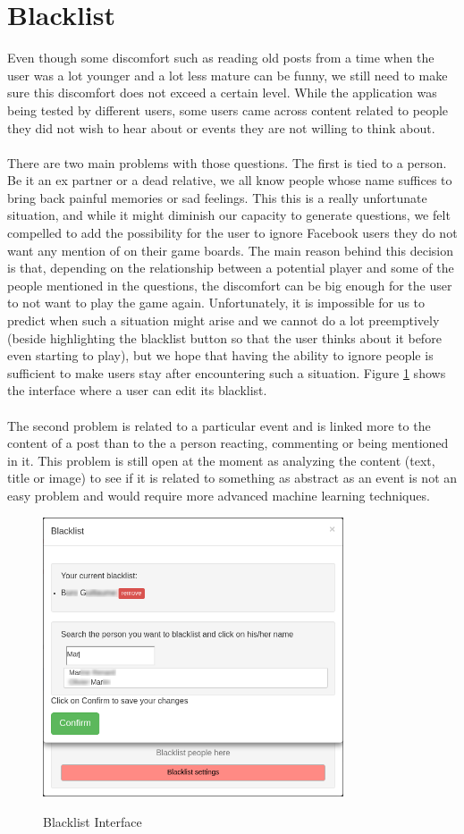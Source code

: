 \section{Blacklist}
Even though some discomfort such as reading old posts from a time when the user was a lot younger and a lot less mature can be funny, we still need to make sure this discomfort does not exceed a certain level. While the application was being tested by different users, some users came across content related to people they did not wish to hear about or events they are not willing to think about.\\\\
There are two main problems with those questions. The first is tied to a person. Be it an ex partner or a dead relative, we all know people whose name suffices to bring back painful memories or sad feelings. This this is a really unfortunate situation, and while it might diminish our capacity to generate questions, we felt compelled to add the possibility for the user to ignore Facebook users they do not want any mention of on their game boards. The main reason behind this decision is that, depending on the relationship between a potential player and some of the people mentioned in the questions, the discomfort can be big enough for the user to not want to play the game again. Unfortunately, it is impossible for us to predict when such a situation might arise and we cannot do a lot preemptively (beside highlighting the blacklist button so that the user thinks about it before even starting to play), but we hope that having the ability to ignore people is sufficient to make users stay after encountering such a situation. Figure \ref{fig:blacklist} shows the interface where a user can edit its blacklist.\\\\
The second problem is related to a particular event and is linked more to the content of a post than to the a person reacting, commenting or being mentioned in it. This problem is still open at the moment as analyzing the content (text, title or image) to see if it is related to something as abstract as an event is not an easy problem and would require more advanced machine learning techniques.
\begin{figure}
\centering
{\includegraphics[width=3.5in]{images/blacklist.png}}
\caption{Blacklist Interface}
\label{fig:blacklist}
\end{figure}

